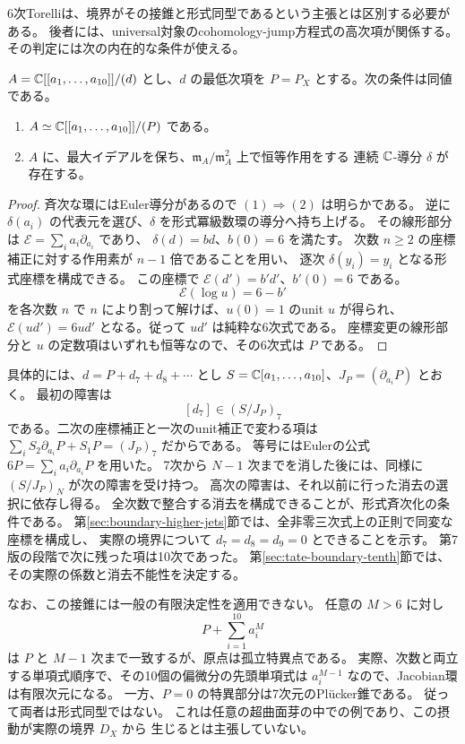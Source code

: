 6次Torelliは、境界がその接錐と形式同型であるという主張とは区別する必要がある。
後者には、universal対象のcohomology-jump方程式の高次項が関係する。
その判定には次の内在的な条件が使える。

\begin{theorem}[形式Euler導分による判定]\label{prop:boundary-euler}
$A=\mathbb C[[a_1,\ldots,a_{10}]]/(d)$ とし、$d$ の最低次項を
$P=P_X$ とする。次の条件は同値である。
\begin{enumerate}
\item $A\simeq\mathbb C[[a_1,\ldots,a_{10}]]/(P)$ である。
\item $A$ に、最大イデアルを保ち、$\mathfrak m_A/\mathfrak m_A^2$ 上で恒等作用をする
連続 $\mathbb C$-導分 $\delta$ が存在する。
\end{enumerate}
\end{theorem}

\begin{proof}
斉次な環にはEuler導分があるので $(1)\Rightarrow(2)$ は明らかである。
逆に $\delta(a_i)$ の代表元を選び、$\delta$ を形式冪級数環の導分へ持ち上げる。
その線形部分は $\mathcal E=\sum_i a_i\partial_{a_i}$ であり、
$\delta(d)=b d$、$b(0)=6$ を満たす。
次数 $n\ge2$ の座標補正に対する作用素が $n-1$ 倍であることを用い、
逐次 $\delta(y_i)=y_i$ となる形式座標を構成できる。
この座標で $\mathcal E(d')=b'd'$、$b'(0)=6$ である。
\[
                      \mathcal E(\log u)=6-b'
\]
を各次数 $n$ で $n$ により割って解けば、$u(0)=1$ のunit $u$ が得られ、
$\mathcal E(ud')=6ud'$ となる。従って $ud'$ は純粋な6次式である。
座標変更の線形部分と $u$ の定数項はいずれも恒等なので、その6次式は $P$ である。
\end{proof}

具体的には、$d=P+d_7+d_8+\cdots$ とし
$S=\mathbb C[a_1,\ldots,a_{10}]$、$J_P=(\partial_{a_i}P)$ とおく。
最初の障害は
\[
                             [d_7]\in(S/J_P)_7
\]
である。二次の座標補正と一次のunit補正で変わる項は
$\sum_iS_2\partial_{a_i}P+S_1P=(J_P)_7$ だからである。
等号にはEulerの公式 $6P=\sum_i a_i\partial_{a_i}P$ を用いた。
7次から $N-1$ 次までを消した後には、同様に $(S/J_P)_N$ が次の障害を受け持つ。
高次の障害は、それ以前に行った消去の選択に依存し得る。
全次数で整合する消去を構成できることが、形式斉次化の条件である。
第\ref{sec:boundary-higher-jets}節では、全非零三次式上の正則で同変な座標を構成し、
実際の境界について $d_7=d_8=d_9=0$ とできることを示す。
第7版の段階で次に残った項は10次であった。
第\ref{sec:tate-boundary-tenth}節では、その実際の係数と消去不能性を決定する。

なお、この接錐には一般の有限決定性を適用できない。
任意の $M>6$ に対し
\[
                         P+\sum_{i=1}^{10}a_i^M
\]
は $P$ と $M-1$ 次まで一致するが、原点は孤立特異点である。
実際、次数と両立する単項式順序で、その10個の偏微分の先頭単項式は
$a_i^{M-1}$ なので、Jacobian環は有限次元になる。
一方、$P=0$ の特異部分は7次元のPl\"ucker錐である。
従って両者は形式同型ではない。
これは任意の超曲面芽の中での例であり、この摂動が実際の境界 $D_X$ から
生じるとは主張していない。


